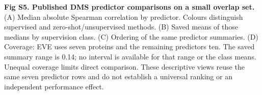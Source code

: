 \caption{{\bf Fig S5. Published DMS predictor comparisons on a small overlap set.} (A) Median absolute Spearman correlation by predictor. Colours distinguish supervised and zero-shot/unsupervised methods. (B) Saved means of those medians by supervision class. (C) Ordering of the same predictor summaries. (D) Coverage: EVE uses seven proteins and the remaining predictors ten. The saved summary range is 0.14; no interval is available for that range or the class means. Unequal coverage limits direct comparison. These descriptive views reuse the same seven predictor rows and do not establish a universal ranking or an independent performance effect.}
